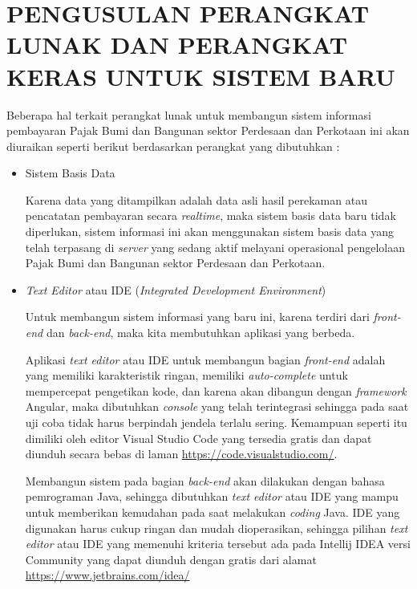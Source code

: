 \documentclass[pdftex,12pt, oneside]{article}
\begin{document}
\section{PENGUSULAN PERANGKAT LUNAK DAN PERANGKAT KERAS UNTUK SISTEM BARU}

Beberapa hal terkait perangkat lunak untuk membangun sistem informasi pembayaran Pajak Bumi dan Bangunan sektor Perdesaan dan Perkotaan ini akan diuraikan seperti berikut berdasarkan perangkat yang dibutuhkan :

\begin{itemize}
	\item Sistem Basis Data
	
Karena data yang ditampilkan adalah data asli hasil perekaman atau pencatatan pembayaran secara \textit{realtime}, maka sistem basis data baru tidak diperlukan, sistem informasi ini akan menggunakan sistem basis data yang telah terpasang di \textit{server} yang sedang aktif melayani operasional pengelolaan Pajak Bumi dan Bangunan sektor Perdesaan dan Perkotaan.
	
	\item \textit{Text Editor} atau IDE (\textit{Integrated Development Environment})
	
Untuk membangun sistem informasi yang baru ini, karena terdiri dari \textit{front-end} dan \textit{back-end}, maka kita membutuhkan aplikasi yang berbeda. 

Aplikasi \textit{text editor} atau IDE untuk membangun bagian \textit{front-end} adalah yang memiliki karakteristik ringan, memiliki \textit{auto-complete} untuk mempercepat pengetikan kode, dan karena akan dibangun dengan \textit{framework} Angular, maka dibutuhkan \textit{console} yang telah terintegrasi sehingga pada saat uji coba tidak harus berpindah jendela terlalu sering. Kemampuan seperti itu dimiliki oleh editor Visual Studio Code yang tersedia gratis dan dapat diunduh secara bebas di laman \href{https://code.visualstudio.com/}{https://code.visualstudio.com/}.

Membangun sistem pada bagian \textit{back-end} akan dilakukan dengan bahasa pemrograman Java, sehingga dibutuhkan \textit{text editor} atau IDE yang mampu untuk memberikan kemudahan pada saat melakukan \textit{coding} Java. IDE yang digunakan harus cukup ringan dan mudah dioperasikan, sehingga pilihan \textit{text editor} atau IDE yang memenuhi kriteria tersebut ada pada Intellij IDEA versi Community yang dapat diunduh dengan gratis dari alamat \href{https://www.jetbrains.com/idea/}{https://www.jetbrains.com/idea/}
	

\end{itemize}
\end{document}
